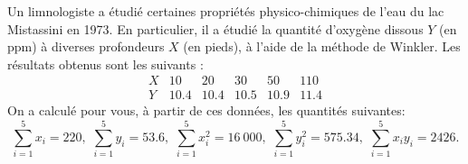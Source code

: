 \begin{questions}




\pageblanche



\question\label{reglin}
Un limnologiste a étudié certaines propriétés physico-chimiques de l'eau du lac Mistassini en 1973. En particulier, il a étudié la quantité d'oxygène dissous $Y$ (en ppm) à diverses profondeurs $X$ (en pieds), à l'aide de la méthode de Winkler. Les résultats obtenus sont les suivants :
\vspace{0.2 cm}
$$
\begin{array}{c|ccccc}
X & 10 & 20 & 30 & 50 & 110   \\  \hline
Y & 10.4 & 10.4 & 10.5 & 10.9 & 11.4
\end{array}
$$
On a calculé pour vous, à partir de ces données, les quantités suivantes:
$$
\sum_{i=1}^{5} x_i  = 220,\,\,  \sum_{i=1}^{5} y_i  = 53.6,\,\,
 \sum_{i=1}^{5} x_i^2  = 16\ 000,\,\,  \sum_{i=1}^{5} y_i^2  = 575.34,\,\,  \sum_{i=1}^{5} x_iy_i  = 2426.
$$
\end{questions}
